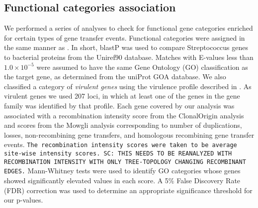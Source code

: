 \documentclass[english]{article}
\begin{document}
\subsection{Functional categories association}
We performed a series of analyses to check for functional gene categories 
enriched for certain types of gene transfer events. Functional categories were 
assigned in the same manner as \citet{Suzuki2011}. In short, blastP was used to 
compare Streptococcus genes to bacterial proteins from the Uniref90 database.  
Matches with E-values less than $1.0\times10^{-5}$ were assumed to have the same Gene Ontology (GO) 
classification as the target gene, as determined from the uniProt GOA database. 
We also classified a category of  \emph{virulent genes} using the virulence 
profile described in \citet{Suzuki2011}. As virulent genes we used 207 loci, in 
which at least one of the genes in the gene family was identified by that 
profile.
Each gene covered by our analysis was associated with a recombination intensity 
score from the ClonalOrigin analysis and scores from the Mowgli 
analysis corresponding to number of duplications, losses, non-recombining 
gene transfers, and homologous recombining gene transfer events. 
\texttt{The recombination intensity scores were taken to be average site-wise intensity 
scores. SC: THIS NEEDS TO BE REANALYZED WITH RECOMBINATION INTENSITY WITH ONLY
TREE-TOPOLOGY CHANGING RECOMBINANT EDGES.} 
Mann-Whitney tests were used to identify GO categories 
whose genes showed significantly elevated values in each score. 
A 5\% False Discovery Rate (FDR) correction \citep{Benjamini1995} was used to 
determine an appropriate significance threshold for our p-values.
\end{document}
